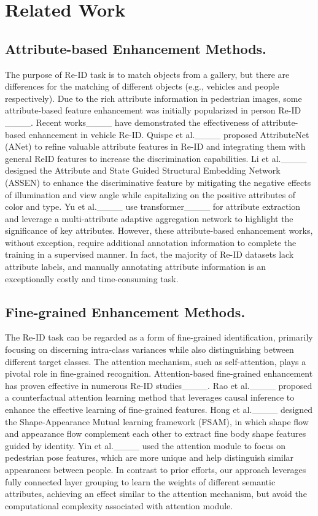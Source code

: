 \section{Related Work}
\subsection{Attribute-based Enhancement Methods.}
The purpose of Re-ID task is to match objects from a gallery, but there are differences for the matching of different objects (e.g., vehicles and people respectively). Due to the rich attribute information in pedestrian images, some attribute-based feature enhancement was initially popularized in person Re-ID ____.
Recent works____ have demonstrated the effectiveness of attribute-based enhancement in vehicle Re-ID. Quispe et al.____ proposed AttributeNet (ANet) to refine valuable attribute features in Re-ID and integrating them with general ReID features to increase the discrimination capabilities. Li et al.____ designed the Attribute and State Guided Structural Embedding Network (ASSEN) to enhance the discriminative feature by mitigating the negative effects of illumination and view angle while capitalizing on the positive attributes of color and type.  
Yu et al.____ use transformer____ for attribute extraction and leverage a multi-attribute adaptive aggregation network to highlight the significance of key attributes. 
However, these attribute-based enhancement works, without exception, require additional annotation information to complete the training in a supervised manner.
In fact, the majority of Re-ID datasets lack attribute labels, and manually annotating attribute information is an exceptionally costly and time-consuming task.


\subsection{Fine-grained Enhancement Methods.}
The Re-ID task can be regarded as a form of fine-grained identification, primarily focusing on discerning intra-class variances while also distinguishing between different target classes. The attention mechanism, such as self-attention, plays a pivotal role in fine-grained recognition. Attention-based fine-grained enhancement has proven effective in numerous Re-ID studies____. Rao et al.____ proposed a counterfactual attention learning method that leverages causal inference to enhance the effective learning of fine-grained features. 
Hong et al.____ designed the Shape-Appearance Mutual learning framework (FSAM), in which shape flow and appearance flow complement each other to extract fine body shape features guided by identity. 
Yin et al.____ used the attention module to focus on pedestrian pose features, which are more unique and help distinguish similar appearances between people.
In contrast to prior efforts, our approach leverages fully connected layer grouping to learn the weights of different semantic attributes, achieving an effect similar to the attention mechanism, but avoid the computational complexity associated with attention module.

